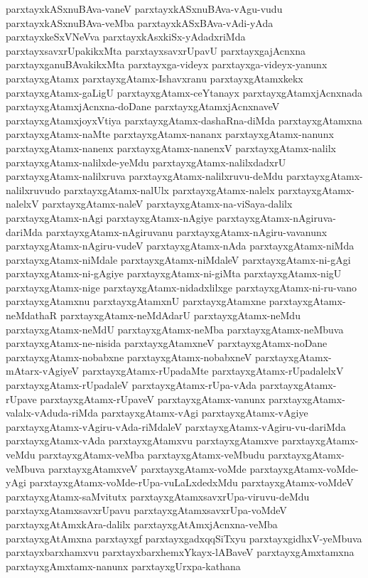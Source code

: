 {parxtayxkASxnuBAva-vaneV
parxtayxkASxnuBAva-vAgu-vudu
parxtayxkASxnuBAva-veMba
parxtayxkASxBAva-vAdi-yAda
parxtayxkeSxVNeVva
parxtayxkAsxkiSx-yAdadxriMda
parxtayxsavxrUpakikxMta
parxtayxsavxrUpavU
parxtayxgajAcnxna
parxtayxganuBAvakikxMta
parxtayxga-videyx
parxtayxga-videyx-yanunx
parxtayxgAtamx
parxtayxgAtamx-Ishavxranu
parxtayxgAtamxkekx
parxtayxgAtamx-gaLigU
parxtayxgAtamx-ceYtanayx
parxtayxgAtamxjAcnxnada
parxtayxgAtamxjAcnxna-doDane
parxtayxgAtamxjAcnxnaveV
parxtayxgAtamxjoyxVtiya
parxtayxgAtamx-dashaRna-diMda
parxtayxgAtamxna
parxtayxgAtamx-naMte
parxtayxgAtamx-nananx
parxtayxgAtamx-nanunx
parxtayxgAtamx-nanenx
parxtayxgAtamx-nanenxV
parxtayxgAtamx-nalilx
parxtayxgAtamx-nalilxde-yeMdu
parxtayxgAtamx-nalilxdadxrU
parxtayxgAtamx-nalilxruva
parxtayxgAtamx-nalilxruvu-deMdu
parxtayxgAtamx-nalilxruvudo
parxtayxgAtamx-nalUlx
parxtayxgAtamx-nalelx
parxtayxgAtamx-nalelxV
parxtayxgAtamx-naleV
parxtayxgAtamx-na-viSaya-dalilx
parxtayxgAtamx-nAgi
parxtayxgAtamx-nAgiye
parxtayxgAtamx-nAgiruva-dariMda
parxtayxgAtamx-nAgiruvanu
parxtayxgAtamx-nAgiru-vavanunx
parxtayxgAtamx-nAgiru-vudeV
parxtayxgAtamx-nAda
parxtayxgAtamx-niMda
parxtayxgAtamx-niMdale
parxtayxgAtamx-niMdaleV
parxtayxgAtamx-ni-gAgi
parxtayxgAtamx-ni-gAgiye
parxtayxgAtamx-ni-giMta
parxtayxgAtamx-nigU
parxtayxgAtamx-nige
parxtayxgAtamx-nidadxlilxge
parxtayxgAtamx-ni-ru-vano
parxtayxgAtamxnu
parxtayxgAtamxnU
parxtayxgAtamxne
parxtayxgAtamx-neMdathaR
parxtayxgAtamx-neMdAdarU
parxtayxgAtamx-neMdu
parxtayxgAtamx-neMdU
parxtayxgAtamx-neMba
parxtayxgAtamx-neMbuva
parxtayxgAtamx-ne-nisida
parxtayxgAtamxneV
parxtayxgAtamx-noDane
parxtayxgAtamx-nobabxne
parxtayxgAtamx-nobabxneV
parxtayxgAtamx-mAtarx-vAgiyeV
parxtayxgAtamx-rUpadaMte
parxtayxgAtamx-rUpadalelxV
parxtayxgAtamx-rUpadaleV
parxtayxgAtamx-rUpa-vAda
parxtayxgAtamx-rUpave
parxtayxgAtamx-rUpaveV
parxtayxgAtamx-vanunx
parxtayxgAtamx-valalx-vAduda-riMda
parxtayxgAtamx-vAgi
parxtayxgAtamx-vAgiye
parxtayxgAtamx-vAgiru-vAda-riMdaleV
parxtayxgAtamx-vAgiru-vu-dariMda
parxtayxgAtamx-vAda
parxtayxgAtamxvu
parxtayxgAtamxve
parxtayxgAtamx-veMdu
parxtayxgAtamx-veMba
parxtayxgAtamx-veMbudu
parxtayxgAtamx-veMbuva
parxtayxgAtamxveV
parxtayxgAtamx-voMde
parxtayxgAtamx-voMde-yAgi
parxtayxgAtamx-voMde-rUpa-vuLaLxdedxMdu
parxtayxgAtamx-voMdeV
parxtayxgAtamx-saMvitutx
parxtayxgAtamxsavxrUpa-viruvu-deMdu
parxtayxgAtamxsavxrUpavu
parxtayxgAtamxsavxrUpa-voMdeV
parxtayxgAtAmxkAra-dalilx
parxtayxgAtAmxjAcnxna-veMba
parxtayxgAtAmxna
parxtayxgf
parxtayxgadxqqSiTxyu
parxtayxgidhxV-yeMbuva
parxtayxbarxhamxvu
parxtayxbarxhemxYkayx-lABaveV
parxtayxgAmxtamxna
parxtayxgAmxtamx-nanunx
parxtayxgUrxpa-kathana
}
